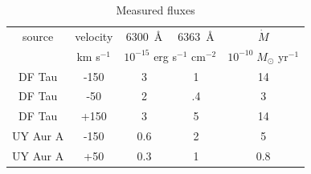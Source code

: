 \documentclass[twocolumn,trackchanges]{aastex63}
\begin{document}
\begin{table}
\caption{Measured fluxes\label{tab:flux}}
\begin{center}
\begin{tabular}{ccccc}
\hline\hline
source & velocity & 6300~\AA{} & 6363~\AA{} & $\dot M$\\ 
       & km s$^{-1}$ & \multicolumn{2}{c}{$10^{-15}$ erg s$^{-1}$ cm$^{-2}$} &
$10^{-10}\;M_{\odot}$ yr$^{-1}$\\
\hline
DF Tau & -150 & 3 & 1 &  14\\
DF Tau & -50 & 2 & .4 & 3\\
DF Tau & +150 & 3 & 5 & 14\\
UY Aur A & -150 & 0.6 & 2 & 5\\
UY Aur A & +50 & 0.3 & 1 & 0.8\\
\end{tabular}
\end{center}
\end{table}
\end{document}
